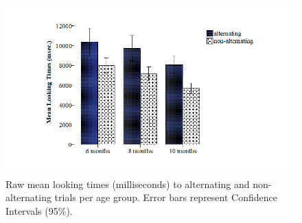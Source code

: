 \documentclass[openright,titlepage,12pt,a4paper]{book}
\begin{document}
\begin{figure}

{\centering \includegraphics[width=0.9\linewidth]{figures/chapter_4/Figure4} 

}

\caption{Raw mean looking times (milliseconds) to alternating and non-alternating trials per age group. Error bars represent Confidence Intervals (95\%).}\label{fig:ch04fig4}
\end{figure}
\end{document}
